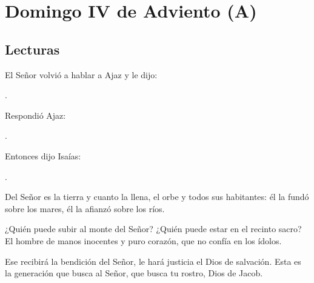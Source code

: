 \chapter{Domingo IV de Adviento (A)}

	\section{Lecturas}


		 

		
		\begin{scripture}
			
			El Señor volvió a hablar a Ajaz y le dijo:
			
			.
			
			Respondió Ajaz:
			
			.
			
			Entonces dijo Isaías:
			
			.
		\end{scripture}


			 

			
			\begin{psbody}
				Del Señor es la tierra y cuanto la llena, 
				el orbe y todos sus habitantes: 
				él la fundó sobre los mares, 
				él la afianzó sobre los ríos. 
				
				¿Quién puede subir al monte del Señor? 
				¿Quién puede estar en el recinto sacro? 
				El hombre de manos inocentes y puro corazón, 
				que no confía en los ídolos. 
				
				Ese recibirá la bendición del Señor, 
				le hará justicia el Dios de salvación. 
				Esta es la generación que busca al Señor, 
				que busca tu rostro, Dios de Jacob.
			\end{psbody}
		


